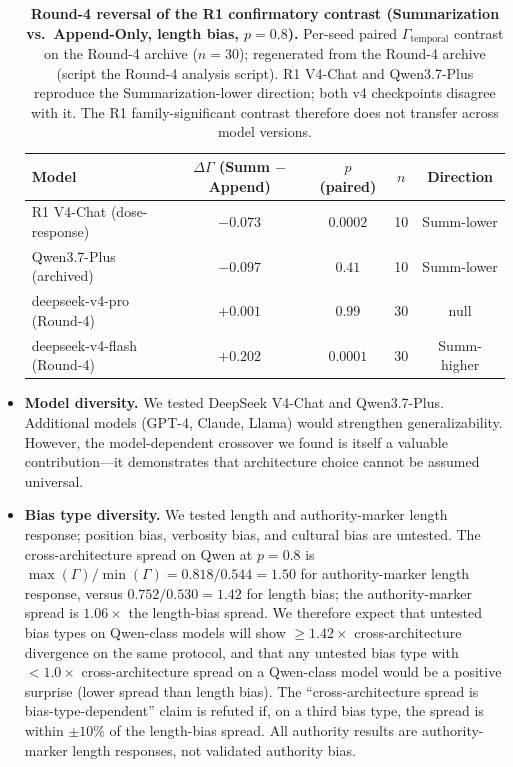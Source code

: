 \documentclass[11pt]{article}
\begin{document}
\begin{itemize}[nosep]
\begin{table}[htbp]
\centering
\caption{\textbf{Round-4 reversal of the R1 confirmatory contrast (Summarization vs.\ Append-Only, length bias, $p{=}0.8$).} Per-seed paired $\Gamma_{\text{temporal}}$ contrast on the Round-4 archive ($n{=}30$); regenerated from the Round-4 archive (script the Round-4 analysis script). R1 V4-Chat and Qwen3.7-Plus reproduce the Summarization-lower direction; both v4 checkpoints disagree with it. The R1 family-significant contrast therefore does not transfer across model versions.}
\label{tab:round4-reversal}
\begin{tabular}{@{}lcccc@{}}
\toprule
Model & $\Delta\Gamma$ (Summ $-$ Append) & $p$ (paired) & $n$ & Direction \\
\midrule
R1 V4-Chat (dose-response) & $-0.073$ & $0.0002$ & 10 & Summ-lower \\
Qwen3.7-Plus (archived) & $-0.097$ & $0.41$ & 10 & Summ-lower \\
deepseek-v4-pro (Round-4) & $+0.001$ & $0.99$ & 30 & null \\
deepseek-v4-flash (Round-4) & $+0.202$ & $0.0001$ & 30 & Summ-higher \\
\bottomrule
\end{tabular}
\end{table}
    \item \textbf{Model diversity.} We tested DeepSeek V4-Chat and Qwen3.7-Plus. Additional models (GPT-4, Claude, Llama) would strengthen generalizability. However, the model-dependent crossover we found is itself a valuable contribution---it demonstrates that architecture choice cannot be assumed universal.
    \item \textbf{Bias type diversity.} We tested length and authority-marker length response; position bias, verbosity bias, and cultural bias are untested. The cross-architecture spread on Qwen at $p=0.8$ is $\max(\Gamma)/\min(\Gamma) = 0.818/0.544 = 1.50$ for authority-marker length response, versus $0.752/0.530 = 1.42$ for length bias; the authority-marker spread is $1.06\times$ the length-bias spread. We therefore expect that untested bias types on Qwen-class models will show $\geq 1.42\times$ cross-architecture divergence on the same protocol, and that any untested bias type with $< 1.0\times$ cross-architecture spread on a Qwen-class model would be a positive surprise (lower spread than length bias). The ``cross-architecture spread is bias-type-dependent'' claim is refuted if, on a third bias type, the spread is within $\pm 10\%$ of the length-bias spread. All authority results are authority-marker length responses, not validated authority bias.

\end{itemize}
\end{document}
